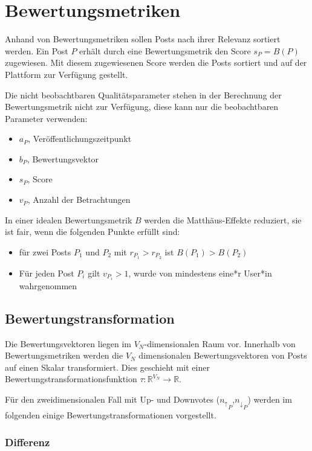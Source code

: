 \chapter{Bewertungsmetriken}
\label{chapter:bewertungsmetriken}

Anhand von Bewertungsmetriken sollen Posts nach ihrer Relevanz sortiert werden. Ein Post $P$ erhält durch eine Bewertungsmetrik den Score $s_P = B(P)$ zugewiesen. Mit diesem zugewiesenen Score werden die Posts sortiert und auf der Plattform zur Verfügung gestellt.


Die nicht beobachtbaren Qualitätsparameter stehen in der Berechnung der Bewertungsmetrik nicht zur Verfügung, diese kann nur die beobachtbaren Parameter verwenden:


\begin{itemize}
	\item $a_P$, Veröffentlichungszeitpunkt
	\item $b_P$, Bewertungsvektor
	\item $s_P$, Score
	\item $v_P$, Anzahl der Betrachtungen
\end{itemize}

In einer idealen Bewertungsmetrik $B$ werden die Matthäus-Effekte reduziert, sie ist fair, wenn die folgenden Punkte erfüllt sind:

\begin{itemize}
	\item für zwei Posts $P_1$ und $P_2$ mit $r_{P_1} > r_{P_2}$ ist $B(P_1) > B(P_2)$
	\item Für jeden Post $P_i$ gilt $v_{P_i} > 1$, wurde von mindestens eine*r User*in wahrgenommen
\end{itemize}

\section{Bewertungstransformation}
\label{voteevaluation}

Die Bewertungsvektoren liegen im $V_N$-dimensionalen Raum vor. Innerhalb von Bewertungsmetriken werden die $V_N$ dimensionalen Bewertungsvektoren von Posts auf einen Skalar transformiert. Dies geschieht mit einer Bewertungstransformationsfunktion $\tau: \mathbb{R}^{V_N} \rightarrow \mathbb{R}$.

Für den zweidimensionalen Fall mit Up- und Downvotes (${n_\uparrow}_P$,${n_\downarrow}_P$) werden im folgenden einige Bewertungstransformationen vorgestellt.

\subsection{Differenz}

